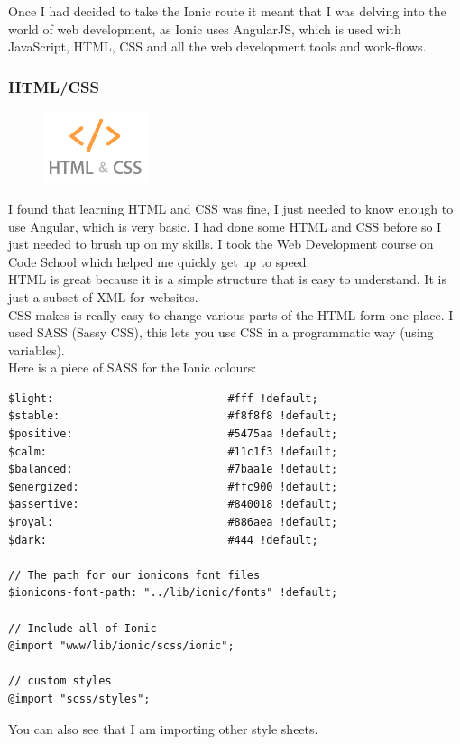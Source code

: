 Once I had decided to take the Ionic route it meant that I was delving into the world of web development, as Ionic uses AngularJS, which is used with JavaScript, HTML, CSS and all the web development tools and work-flows.

\subsubsection{HTML/CSS}
\begin{figure}
\includegraphics[width=3cm]{img/mobile-app/logos/html-css.jpg}
\end{figure} 
I found that learning HTML \cite{html} and CSS \cite{css} was fine, I just needed to know enough to use Angular, which is very basic.
I had done some HTML and CSS before so I just needed to brush up on my skills.
I took the Web Development \cite{codeschool_webdev} course on Code School which helped me quickly get up to speed.
\\

HTML is great because it is a simple structure that is easy to understand.
It is just a subset of XML for websites.
\\

CSS makes is really easy to change various parts of the HTML form one place.
I used SASS (Sassy CSS), this lets you use CSS in a programmatic way (using variables).
\\

Here is a piece of SASS for the Ionic colours:
\begin{verbatim}
$light:                           #fff !default;
$stable:                          #f8f8f8 !default;
$positive:                        #5475aa !default; 
$calm:                            #11c1f3 !default;
$balanced:                        #7baa1e !default; 
$energized:                       #ffc900 !default;
$assertive:                       #840018 !default;
$royal:                           #886aea !default;
$dark:                            #444 !default;

// The path for our ionicons font files
$ionicons-font-path: "../lib/ionic/fonts" !default;

// Include all of Ionic
@import "www/lib/ionic/scss/ionic";

// custom styles
@import "scss/styles";
\end{verbatim}
You can also see that I am importing other style sheets.



